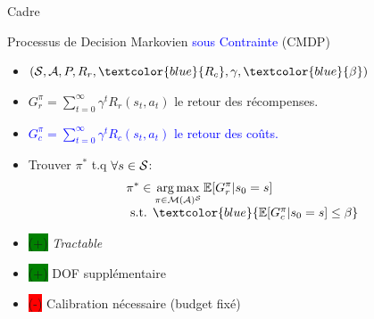 \documentclass[french,handout]{beamer}
\newcommand{\cplus}{\colorbox{green}{(+)} }
\newcommand{\cmoins}{\colorbox{red}{(-)} }
\begin{document}
    \begin{frame}{Cadre}

        \begin{block}{Processus de Decision Markovien \textcolor{blue}{sous Contrainte} (CMDP)}
            \begin{itemize}
                \item $(\cS, \cA, P, R_r,\textcolor{blue}{R_c}, \gamma,\textcolor{blue}{\beta})$
                \item $G_r^\pi = \sum_{t=0}^\infty \gamma^t R_r(s_t, a_t)$ le retour des récompenses.
                \item \textcolor{blue}{ $G_c^\pi = \sum_{t=0}^\infty \gamma^t R_c(s_t, a_t)$ le retour des coûts.}
                \item Trouver $\pi^*$ t.q $\forall s\in\mathcal{S}$:
                \begin{equation}
                    \label{eq:cmdp}
                    \begin{array}{lcr}
                        \displaystyle \pi^* \in \argmax_{\pi\in\cM(\cA)^\cS} \expectedvalue[G_r^\pi | s_0=s] \\
                        \text{ s.t. }  \textcolor{blue}{\expectedvalue[G_c^\pi | s_0=s] \leq \beta}
                    \end{array}
                \end{equation}
            \end{itemize}
        \end{block}

        \begin{block}{}
            \begin{itemize}
                \item \cplus \textit{Tractable}
                \item \cplus DOF supplémentaire %
                \item \cmoins Calibration nécessaire (budget fixé)


            \end{itemize}
        \end{block}

    \end{frame}
\end{document}
